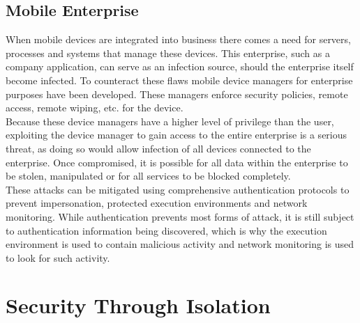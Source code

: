 
\subsection{Mobile Enterprise}

\label{Ch2 Sec2 Sub5}

When mobile devices are integrated into business there comes a need for servers, processes and systems that manage these devices. This enterprise, such as a company application, can serve as an infection source, should the enterprise itself become infected. To counteract these flaws mobile device managers for enterprise purposes have been developed. These managers enforce security policies, remote access, remote wiping, etc. for the device.\\
Because these device managers have a higher level of privilege than the user, exploiting the device manager to gain access to the entire enterprise is a serious threat, as doing so would allow infection of all devices connected to the enterprise. Once compromised, it is possible for all data within the enterprise to be stolen, manipulated or for all services to be blocked completely.\\
These attacks can be mitigated using comprehensive authentication protocols to prevent impersonation, protected execution environments and network monitoring. While authentication prevents most forms of attack, it is still subject to authentication information being discovered, which is why the execution environment is used to contain malicious activity and network monitoring is used to look for such activity.\cite{Reference13}


\section{Security Through Isolation}

\label{Ch2 Sec3}

